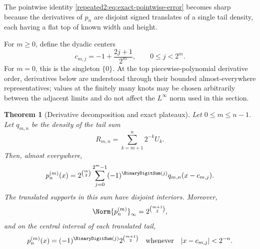 \documentclass[11pt,oneside]{article}
\newtheorem{theorem}{Theorem}[section]
\theoremstyle{definition}
\theoremstyle{remark}
\begin{document}
The pointwise identity \eqref{repeated2:eq:exact-pointwise-error} becomes sharp because the derivatives
of $p_n$ are disjoint signed translates of a single tail density, each having a flat top of
known width and height.

For $m\ge0$, define the dyadic centers
\begin{equation}
 c_{m,j}=-1+\frac{2j+1}{2^m},
 \qquad 0\le j<2^m.
 \label{repeated2:eq:cmj-definition}
\end{equation}
For $m=0$, this is the singleton $\{0\}$.  At the top piecewise-polynomial derivative
order, derivatives below are understood through their bounded almost-everywhere
representatives; values at the finitely many knots may be chosen arbitrarily between the
adjacent limits and do not affect the $L^\infty$ norm used in this section.

\begin{theorem}[Derivative decomposition and exact plateaux]
\label{repeated2:thm:partial-derivative-geometry}
Let $0\le m\le n-1$.  Let $q_{m,n}$ be the density of the tail sum
\begin{equation}
 R_{m,n}=\sum_{k=m+1}^{n}2^{-k}U_k.
 \label{repeated2:eq:Rmn}
\end{equation}
Then, almost everywhere,
\begin{equation}
 p_n^{(m)}(x)=2^{\binom m2}
 \sum_{j=0}^{2^m-1}(-1)^{\BinaryDigitSum(j)}q_{m,n}(x-c_{m,j}).
 \label{repeated2:eq:pnm-decomposition}
\end{equation}
The translated supports in this sum have disjoint interiors.  Moreover,
\begin{equation}
 \Norm{p_n^{(m)}}_\infty=2^{\binom{m+1}{2}},
 \label{repeated2:eq:pnm-norm}
\end{equation}
and on the central interval of each translated tail,
\begin{equation}
 p_n^{(m)}(x)=(-1)^{\BinaryDigitSum(j)}2^{\binom{m+1}{2}}
 \quad\text{whenever}\quad |x-c_{m,j}|<2^{-n}.
 \label{repeated2:eq:pnm-plateau}
\end{equation}
\end{theorem}
\end{document}
